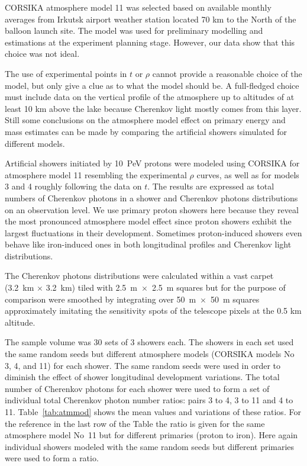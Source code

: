 \documentclass[universe,article,submit,moreauthors,pdftex]{Definitions/mdpi}
\begin{document}
\begin{paracol}{2}
CORSIKA atmosphere model 11 was selected based on available monthly averages from Irkutsk airport weather station located 70 km to the North of the balloon launch site. The model was used for preliminary modelling and estimations at the experiment planning stage. However, our data show that this choice was not ideal.

The use of experimental points in $t$ or $\rho$ cannot provide a reasonable choice of the model, but only give a clue as to what the model should be. A full-fledged choice must include data on the vertical profile of the atmosphere up to altitudes of at least 10 km above the lake because Cherenkov light mostly comes from this layer. Still some conclusions on the atmosphere model effect on primary energy and mass estimates can be made by comparing the artificial showers simulated for different models.

Artificial showers initiated by 10~PeV protons were modeled using CORSIKA for atmosphere model 11 resembling the experimental $\rho$ curves, as well as for models 3 and 4 roughly following the data on $t$. The results are expressed as total numbers of Cherenkov photons in a shower and Cherenkov photons distributions on an observation level. We use primary proton showers here because they reveal the most pronounced atmosphere model effect since proton showers exhibit the largest fluctuations in their development. Sometimes proton-induced showers even behave like iron-induced ones in both longitudinal profiles and Cherenkov light distributions. 

The Cherenkov photons distributions were calculated within a vast carpet (3.2~km $\times$ 3.2~km) tiled with 2.5~m~$\times$~2.5~m squares but for the purpose of comparison were smoothed by integrating over 50~m~$\times$~50~m squares approximately imitating the sensitivity spots of the telescope pixels at the 0.5 km altitude.

The sample volume was 30 sets of 3 showers each. The showers in each set used the same random seeds but different atmosphere models (CORSIKA models No 3, 4, and 11) for each shower. The same random seeds were used in order to diminish the effect of shower longitudinal development variations. The total number of Cherenkov photons for each shower were used to form a set of individual total Cherenkov photon number ratios: pairs 3 to 4, 3 to 11 and 4 to 11. Table~\ref{tab:atmmod} shows the mean values and variations of these ratios. For the reference in the last row of the Table the ratio is given for the same atmosphere model No~11 but for different primaries (proton to iron). Here again individual showers modeled with the same random seeds but different primaries were used to form a ratio. 


\end{paracol}
\end{document}
